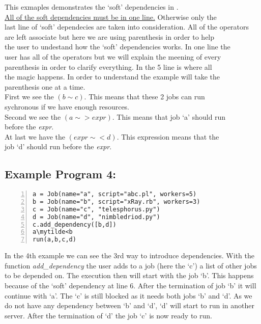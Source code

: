 This exmaples demonstrates the `soft' dependencies in \lang{}.\\
\underline{All of the soft dependencies must be in one line.} Otherwise only the\\
last line of `soft' dependecies are taken into consideration. All of the operators\\
are left associate but here we are using parenthesis in order to help\\
the user to undestand how the `soft' dependencies works. In one line the \\
user has all of the operators but we will explain the meening of every \\
parenthesis in order to  clarify everything. In the 5 line is where all \\
the magic happens. In order to understand the example will take the\\
parenthesis one at a time.\\
First we see the $(b\sim c)$. This means that these 2 jobs can run\\
sychronous if we have enough resources. \\
Second we see the $(a\sim>expr)$. This means that job `a' should run\\
before the \textit{expr}. \\
At last we have the $(expr\sim<d)$. This expression means that the \\
job `d' should run before the \textit{expr}.

\subsection*{Example Program 4:}
\begin{Verbatim}[numbers=left,commandchars=\\\{\}]
a = Job(name="a", script="abc.pl", workers=5)
b = Job(name="b", script="xRay.rb", workers=3)
c = Job(name="c", "telesphorus.py")
d = Job(name="d", "nimbledriod.py")
c.add_dependency([b,d])
a\mytilde<b
run(a,b,c,d)
\end{Verbatim}

In the 4th example we can see the 3rd way to introduce dependencies.
With the function \textit{add\_dependency} the user adds to a job (here the `c')
a list of other jobs to be depended on. The execution then will start with the job
`b'. This happens because of the `soft' dependency at line 6. After the termination of job `b'
it will continue with `a'. The `c' is still blocked as it needs both jobs `b' and `d'.
As we do not have any dependency between `b' and `d', `d' will start to run in another
server. After the termination of `d' the job `c' is now ready to run.

